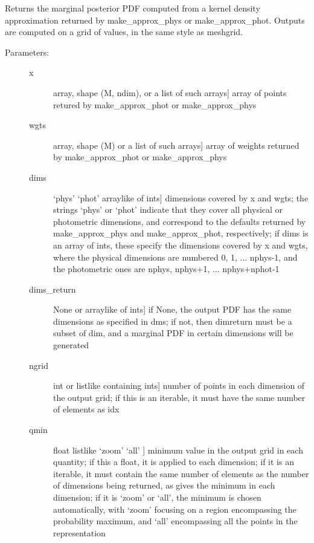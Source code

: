 \documentclass[letterpaper,10pt,english]{sphinxmanual}
\begin{document}
\begin{fulllineitems}
\begin{fulllineitems}
\end{fulllineitems}


\begin{fulllineitems}
\label{bayesphot:slugpy.bayesphot.bp.bp.mpdf_approx}
Returns the marginal posterior PDF computed from a kernel
density approximation returned by make\_approx\_phys or
make\_approx\_phot. Outputs are computed on a grid of values, in
the same style as meshgrid.
\begin{description}
\item[{Parameters:}] \leavevmode\begin{description}
\item[{x}] \leavevmode{[}array, shape (M, ndim), or a list of such arrays{]}
array of points retured by make\_approx\_phot or
make\_approx\_phys

\item[{wgts}] \leavevmode{[}array, shape (M) or a list of such arrays{]}
array of weights returned by make\_approx\_phot or
make\_approx\_phys

\item[{dims}] \leavevmode{[}`phys' \textbar{} `phot' \textbar{} arraylike of ints{]}
dimensions covered by x and wgts; the strings `phys' or
`phot' indicate that they cover all physical or
photometric dimensions, and correspond to the defaults
returned by make\_approx\_phys and make\_approx\_phot,
respectively; if dims is an array of ints, these specify
the dimensions covered by x and wgts, where the
physical dimensions are numbered 0, 1, ... nphys-1, and
the photometric ones are nphys, nphys+1,
... nphys+nphot-1

\item[{dims\_return}] \leavevmode{[}None or arraylike of ints{]}
if None, the output PDF has the same dimensions as
specified in dms; if not, then dimreturn must be a
subset of dim, and a marginal PDF in certain dimensions
will be generated

\item[{ngrid}] \leavevmode{[}int or listlike containing ints{]}
number of points in each dimension of the output grid;
if this is an iterable, it must have the same number of
elements as idx

\item[{qmin}] \leavevmode{[}float \textbar{} listlike \textbar{} `zoom' \textbar{} `all' {]}
minimum value in the output grid in each quantity; if
this a float, it is applied to each dimension; if it is
an iterable, it must contain the same number of elements
as the number of dimensions being returned, as gives the
minimum in each dimension; if it is `zoom' or `all', the
minimum is chosen automatically, with `zoom' focusing on
a region encompassing the probability maximum, and `all'
encompassing all the points in the representation


\end{description}
\end{description}
\end{fulllineitems}
\end{fulllineitems}
\end{document}
